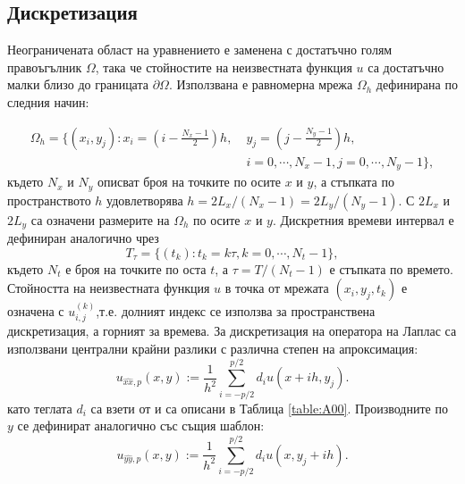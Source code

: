 \documentclass[a4paper]{article}
\theoremstyle{remark}
\begin{document}
\subsection{Дискретизация}\label{discretization}
Неограничената област на уравнението е заменена с достатъчно голям правоъгълник $\Omega$, така че стойностите на неизвестната функция $u$ са достатъчно малки близо до границата $\partial \Omega$. Използвана е равномерна мрежа  $\Omega_h$ дефинирана по следния начин:

\begin{align}\label{Omega}
\Omega_h = \{(x_i,y_j): x_i = (i-\frac{N_x-1}{2})h, \; &y_j = (j-\frac{N_y-1}{2})h, \nonumber\\
                                         & i = 0,\cdots, N_x-1, j = 0 ,\cdots , N_y-1 \},
\end{align}
където $N_x$ и $N_y$ описват броя на точките по осите $x$ и $y$, а стъпката по пространството $h$ удовлетворява $h =2 L_x/(N_x-1) =2 L_y/(N_y-1)$.
С $2 L_x$ и $2 L_y$ са означени размерите на $\Omega_h$ по осите $x$ и $y$. Дискретния времеви интервал е дефиниран аналогично чрез
$$
T_{\tau} = \{(t_k): t_k = k\tau, k = 0,\cdots ,N_t-1 \},
$$
където $N_t$ е броя на точките по оста $t$, а $\tau = T/(N_t-1)$ е стъпката по времето. Стойността на неизвестната функция $u$ в точка от мрежата $(x_i,y_j,t_k)$ е означена с $u_{i,j}^{(k)}$,т.е. долният индекс се използва за пространствена дискретизация, а горният за времева. За дискретизация на оператора на Лаплас са използвани централни крайни разлики с различна степен на апроксимация:
\begin{equation}\label{fdx}
u_{\widehat{xx},p}(x,y) :=  \frac{1}{h^2} \sum\limits_{i=-p/2}^{p/2} d_i u(x+ih, y_j).
\end{equation}
като теглата $d_i$ са взети от \cite{forn} и са описани в Таблица \ref{table:A00}. Производните по $y$ се дефинират аналогично със същия шаблон:
\begin{equation}\label{fdy}
u_{\widehat{yy},p}(x,y) :=  \frac{1}{h^2} \sum\limits_{i=-p/2}^{p/2} d_i u(x, y_j+ih).
\end{equation}
\end{document}
